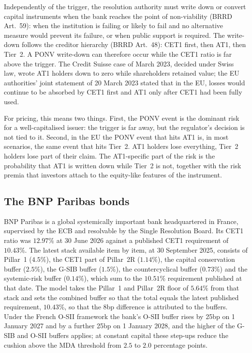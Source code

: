 Independently of the trigger, the resolution authority must write down or convert
capital instruments when the bank reaches the point of non-viability (BRRD Art.~59):
when the institution is failing or likely to fail and no alternative measure would
prevent its failure, or when public support is required. The write-down follows the
creditor hierarchy (BRRD Art.~48): CET1 first, then AT1, then Tier~2. A PONV write-down
can therefore occur while the CET1 ratio is far above the trigger. The Credit Suisse
case of March 2023, decided under Swiss law, wrote AT1 holders down to zero while
shareholders retained value; the EU authorities' joint statement of 20 March 2023
stated that in the EU, losses would continue to be absorbed by CET1 first and AT1 only
after CET1 had been fully used.

For pricing, this means two things. First, the PONV event is the dominant risk for a
well-capitalised issuer: the trigger is far away, but the regulator's decision is not
tied to it. Second, in the EU the PONV event that hits AT1 is, in most scenarios, the
same event that hits Tier~2. AT1 holders lose everything, Tier~2 holders lose part of
their claim. The AT1-specific part of the risk is the probability that AT1 is written
down while Tier~2 is not, together with the risk premia that investors attach to the
equity-like features of the instrument.

\subsection{The BNP Paribas bonds}

BNP Paribas is a global systemically important bank headquartered in France, supervised
by the ECB and resolvable by the Single Resolution Board. Its CET1 ratio was $12.97\%$ at
30 June 2026 against a published CET1 requirement of $10.43\%$. The latest stack available
item by item, at 30 September 2025, consists of Pillar~1 ($4.5\%$), the CET1 part of
Pillar~2R ($1.14\%$), the capital conservation buffer ($2.5\%$), the G-SIB buffer
($1.5\%$), the countercyclical buffer ($0.73\%$) and the systemic-risk buffer ($0.14\%$),
which sum to the $10.51\%$ requirement published at that date. The model takes the
Pillar~1 and Pillar~2R floor of $5.64\%$ from that stack and sets the combined buffer so
that the total equals the latest published requirement, $10.43\%$, so that the $8$bp
difference is attributed to the buffers. Under the French O-SII framework the
bank's O-SII buffer rises by 25bp on 1 January 2027 and by a further 25bp on 1 January
2028, and the higher of the G-SIB and O-SII buffers applies; at constant capital these
step-ups reduce the cushion above the MDA threshold from $2.5$ to $2.0$ percentage
points.

